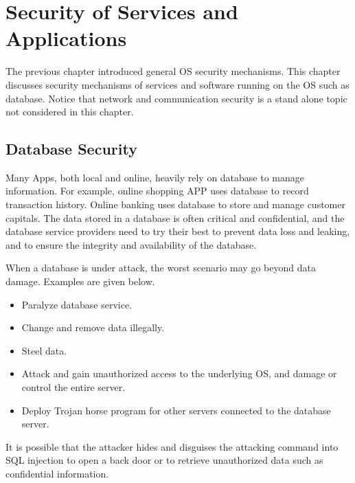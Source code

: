 \chapter{Security of Services and Applications}

The previous chapter introduced general OS security mechanisms. This chapter discusses security mechanisms of services and software running on the OS such as database. Notice that network and communication security is a stand alone topic not considered in this chapter. 

\section{Database Security}

Many Apps, both local and online, heavily rely on database to manage information. For example, online shopping APP uses database to record transaction history. Online banking uses database to store and manage customer capitals. The data stored in a database is often critical and confidential, and the database service providers need to try their best to prevent data loss and leaking, and to ensure the integrity and availability of the database.

When a database is under attack, the worst scenario may go beyond data damage. Examples are given below.
\begin{itemize}
	\item Paralyze database service.
	\item Change and remove data illegally.
	\item Steel data.
	\item Attack and gain unauthorized access to the underlying OS, and damage or control the entire server.
	\item Deploy Trojan horse program for other servers connected to the database server.
\end{itemize}

It is possible that the attacker hides and disguises the attacking command into SQL injection to open a back door or to retrieve unauthorized data such as confidential information.

